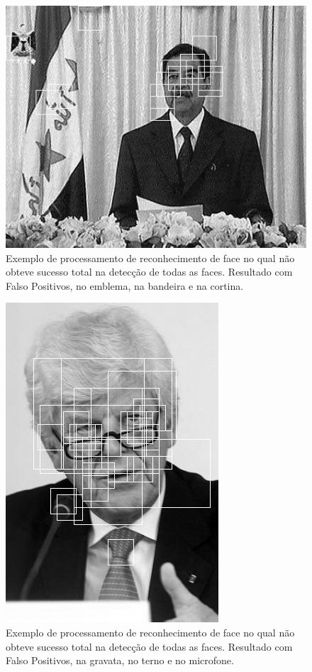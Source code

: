 \documentclass[10pt, conference]{IEEEtran}
\begin{document}
	\begin{figure}[ht]
		\centering
		\includegraphics[width=0.75\linewidth]{img/detect_3.jpg}
		\caption{Exemplo de processamento de reconhecimento de face no qual não obteve sucesso total na detecção de todas as faces. Resultado com Falso Positivos, no emblema, na bandeira e na cortina.}
		\label{fig:detect_3}
	\end{figure}

	\begin{figure}[ht]
		\centering
		\includegraphics[width=0.7\linewidth]{img/detect_4.jpg}
		\caption{Exemplo de processamento de reconhecimento de face no qual não obteve sucesso total na detecção de todas as faces. Resultado com Falso Positivos, na gravata, no terno e no microfone.}
		\label{fig:detect_4}
	\end{figure}
\end{document}
